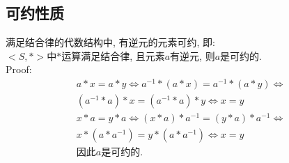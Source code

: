 \documentclass{article}
\begin{document}
\begin{cuenotes}
{        \section*{可约性质}
        满足结合律的代数结构中, 有逆元的元素可约, 即: \\
        \( <S,*> \)中\( * \)运算满足结合律, 且元素\( a \)有逆元, 则\( a \)是可约的. \\
        Proof:
        \[
            \begin{split}
                a*x=a*y\iff a^{-1}*(a*x)=a^{-1}*(a*y)\iff \\
                (a^{-1}*a)*x=(a^{-1}*a)*y\iff x=y \\
                x*a=y*a\iff (x*a)*a^{-1}=(y*a)*a^{-1}\iff \\
                x*(a*a^{-1})=y*(a*a^{-1})\iff x=y \\
                \text{因此}a\text{是可约的}.
            \end{split}
        \]
    }
\end{cuenotes}
\end{document}
